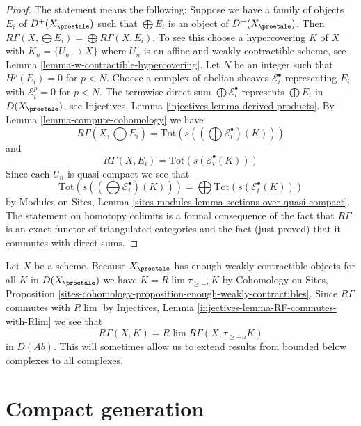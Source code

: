 \begin{proof}
The statement means the following: Suppose we have a family of objects
$E_i$ of $D^+(X_\proetale)$ such that $\bigoplus E_i$ is an object
of $D^+(X_\proetale)$. Then
$R\Gamma(X, \bigoplus E_i) = \bigoplus R\Gamma(X, E_i)$.
To see this choose a hypercovering $K$ of $X$ with $K_n = \{U_n \to X\}$
where $U_n$ is an affine and weakly contractible scheme, see
Lemma \ref{lemma-w-contractible-hypercovering}.
Let $N$ be an integer such that $H^p(E_i) = 0$ for $p < N$.
Choose a complex of abelian sheaves $\mathcal{E}_i^\bullet$
representing $E_i$ with $\mathcal{E}_i^p = 0$ for $p < N$.
The termwise direct sum $\bigoplus \mathcal{E}_i^\bullet$ represents
$\bigoplus E_i$ in $D(X_\proetale)$, see
Injectives, Lemma \ref{injectives-lemma-derived-products}.
By Lemma \ref{lemma-compute-cohomology} we have
$$
R\Gamma(X, \bigoplus E_i) =
\text{Tot}(s((\bigoplus \mathcal{E}^\bullet_i)(K)))
$$
and
$$
R\Gamma(X, E_i) = \text{Tot}(s(\mathcal{E}^\bullet_i(K)))
$$
Since each $U_n$ is quasi-compact we see that
$$
\text{Tot}(s((\bigoplus \mathcal{E}^\bullet_i)(K))) =
\bigoplus \text{Tot}(s(\mathcal{E}^\bullet_i(K)))
$$
by Modules on Sites, Lemma
\ref{sites-modules-lemma-sections-over-quasi-compact}.
The statement on homotopy colimits is a formal consequence of the fact
that $R\Gamma$ is an exact functor of triangulated categories and the
fact (just proved) that it commutes with direct sums.
\end{proof}

\begin{remark}
\label{remark-extend-to-all}
Let $X$ be a scheme. Because $X_\proetale$ has enough weakly contractible
objects for all $K$ in $D(X_\proetale)$ we have $K = R\lim \tau_{\geq -n}K$
by
Cohomology on Sites, Proposition
\ref{sites-cohomology-proposition-enough-weakly-contractibles}.
Since $R\Gamma$ commutes with $R\lim$ by
Injectives, Lemma \ref{injectives-lemma-RF-commutes-with-Rlim}
we see that
$$
R\Gamma(X, K) = R\lim R\Gamma(X, \tau_{\geq -n}K)
$$
in $D(\textit{Ab})$. This will sometimes allow us to extend results from
bounded below complexes to all complexes.
\end{remark}







\section{Compact generation}
\label{section-compact-generation}

